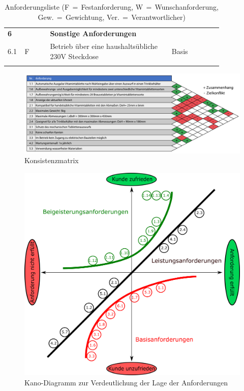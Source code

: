 \begin{longtable}{C{0.03\linewidth}C{0.05\linewidth}C{0.05\linewidth}L{0.5\linewidth}C{0.14\linewidth}C{0.07\linewidth}}
	\midrule
	
	\textbf{6} & & & \textbf{Sonstige Anforderungen} &&\\
	6.1 & F & & Betrieb über eine haushaltsübliche 230V Steckdose & Basis &\\
	
	\bottomrule
	
	\caption{Anforderungsliste (F$\,=\,$Festanforderung, W$\,=\,$Wunschanforderung, Gew.$\,=\,$Gewichtung, Ver.$\,=\,$Verantwortlicher)}
	\label{anforderungsliste}
\end{longtable}

\begin{figure}[H]
	\centering
	\includegraphics[width=1.0\linewidth]{chapter/Bilder/konsistenzmatrix}
	\caption{Konsistenzmatrix}
	\label{fig:konsistenzmatrix}
\end{figure}

\FloatBarrier
\begin{figure}[h!]
	\centering
	\includegraphics[width=\textwidth]{chapter/Bilder/kano} 
	\caption{Kano-Diagramm zur Verdeutlichung der Lage der Anforderungen}
\end{figure}

